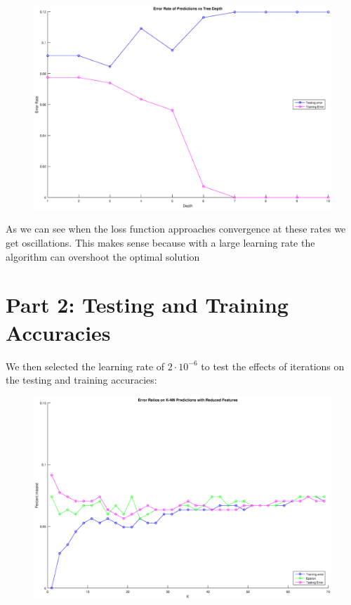 \documentclass{article}
\begin{document}
	\newpage
	
	\begin{figure}[h!]
		\begin{center} 
			\includegraphics[scale=0.4]{depth.eps} 
		\end{center} 
		\label{fig:M2}
	\end{figure}
	
	As we can see when the loss function approaches convergence at these rates we get oscillations. This makes sense because with a large learning rate the algorithm can overshoot the optimal solution
	
	\section*{Part 2: Testing and Training Accuracies}
	
	We then selected the learning rate of $2 \cdot 10^{-6}$ to test the effects of iterations on the testing and training accuracies:
	\newpage
	
	\begin{figure}[h!]
		\begin{center} 
			\includegraphics[scale=0.4]{reduced.eps} 
		\end{center}  
		\label{fig:M3}
	\end{figure}
\end{document}
